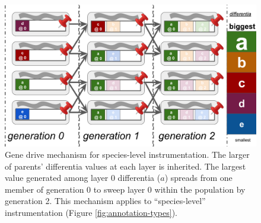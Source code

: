 \begin{figure}
  \centering
  \includegraphics[width=\textwidth]{img/gene-drive}
  \caption{
    Gene drive mechanism for species-level instrumentation.
    The larger of parents' differentia values at each layer is inherited.
    The largest value generated among layer 0 differentia ($a$) spreads from one member of generation 0 to sweep layer 0 within the population by generation 2.
    This mechanism applies to ``species-level'' instrumentation (Figure \ref{fig:annotation-types}).
  }
  \label{fig:gene-drive}
\end{figure}
